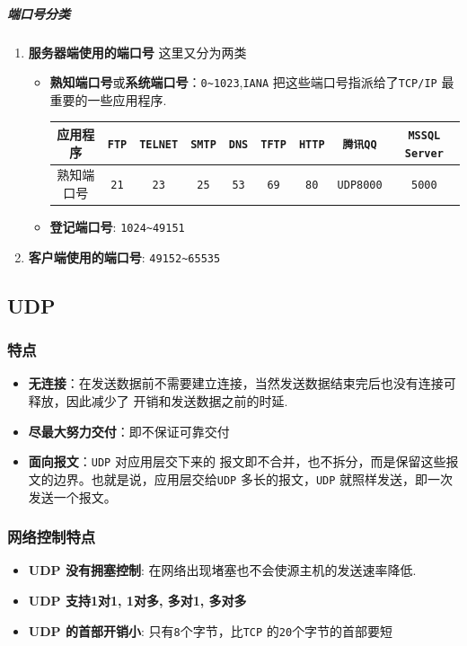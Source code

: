 \documentclass[UTF8,a4paper,12pt]{ctexbook}
\begin{document}
				\subparagraph{端口号分类}
					\begin{enumerate}[fullwidth,itemindent = 2em,label=(\arabic*)]
						\item \textbf{服务器端使用的端口号} 这里又分为两类
							\begin{itemize}[itemindent = 3em]
								\item \textbf{熟知端口号}或\textbf{系统端口号}：\verb|0~1023|,\verb|IANA| 把这些端口号指派给了\verb|TCP/IP| 最重要的一些应用程序.
									\begin{table}[H]
										\centering
										\begin{tabular}{|c|c|c|c|c|c|c|c|c|}
											\hline
											应用程序  & \verb|FTP| & \verb|TELNET| & \verb|SMTP| & \verb|DNS| & \verb|TFTP| & \verb|HTTP| & \verb|腾讯QQ| & \verb|MSSQL Server| \\
											\hline
											熟知端口号   & \verb|21| & \verb|23| & \verb|25| & \verb|53| & \verb|69| & \verb|80| & \verb|UDP8000| & \verb|5000| \\
											\hline
										\end{tabular}
									\end{table}
								\item \textbf{登记端口号}: \verb|1024~49151|
							\end{itemize}
						\item \textbf{客户端使用的端口号}: \verb|49152~65535| 
					\end{enumerate} 
		\subsection{UDP}
			\subsubsection{特点}
				\begin{itemize}
					\item \textbf{无连接}：在发送数据前不需要建立连接，当然发送数据结束完后也没有连接可释放，因此减少了 开销和发送数据之前的时延.
					\item \textbf{尽最大努力交付}：即不保证可靠交付
					\item \textbf{面向报文}：\verb|UDP| 对应用层交下来的 报文即不合并，也不拆分，而是保留这些报文的边界。也就是说，应用层交给\verb|UDP| 多长的报文，\verb|UDP| 就照样发送，即一次发送一个报文。
				\end{itemize}
			\subsubsection{网络控制特点}
				\begin{itemize}
					\item \textbf{UDP 没有拥塞控制}: 在网络出现堵塞也不会使源主机的发送速率降低.
					\item \textbf{UDP 支持1对1, 1对多, 多对1, 多对多}
					\item \textbf{UDP 的首部开销小}: 只有\verb|8|个字节，比\verb|TCP| 的\verb|20|个字节的首部要短
				\end{itemize}
\end{document}
